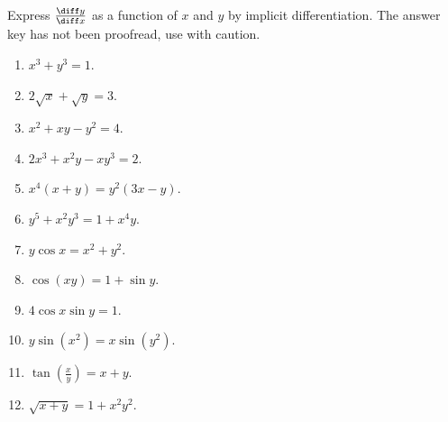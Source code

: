 Express $\frac{\diff y}{\diff x}$ as a function of $x$ and $y$ by implicit differentiation. The answer key has not been proofread, use with caution.
\begin{multicols}{2}
\begin{enumerate}[ref={\fcProblemRef}]
\item $\displaystyle x^3+y^3=1$.

\item $\displaystyle  2\sqrt x+\sqrt y=3$.

\item $\displaystyle  x^2+x y-y^2=4$.

\item $\displaystyle  2x^3+x^2y-x y^3=2$.

\item $\displaystyle  x^4(x+y)=y^2(3x-y)$.

\item $\displaystyle  y^5+x^2y^3=1+x^4y $.

\item $\displaystyle  y\cos x=x^2+y^2 $.

\item $\displaystyle  \cos (x y)=1+\sin y$.

\item $\displaystyle  4\cos x\sin y=1$.

\item $\displaystyle  y\sin \left(x^2\right)=x\sin \left(y^2\right)$.

\item $\displaystyle \tan \left(\frac{x}{y} \right)=x+y$.

\item $\displaystyle  \sqrt{x+y}=1+x^2y^2$.


\end{enumerate}
\end{multicols}
